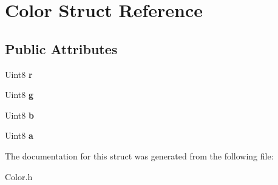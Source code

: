 \hypertarget{struct_color}{}\section{Color Struct Reference}
\label{struct_color}
\subsection*{Public Attributes}
\begin{DoxyCompactItemize}
\item 
\mbox{\label{struct_color_a7953638afd0a75b0eb837f47fc64bb0c}} 
Uint8 {\bfseries r}
\item 
\mbox{\label{struct_color_a3ecdd61478c70580cb1f31a6d5075afc}} 
Uint8 {\bfseries g}
\item 
\mbox{\label{struct_color_a010dfea24ef55827d62d1c02c74ba783}} 
Uint8 {\bfseries b}
\item 
\mbox{\label{struct_color_a999bf399ffcdc659430abbe5254bdd92}} 
Uint8 {\bfseries a}
\end{DoxyCompactItemize}


The documentation for this struct was generated from the following file\+:\begin{DoxyCompactItemize}
\item 
Color.\+h\end{DoxyCompactItemize}
